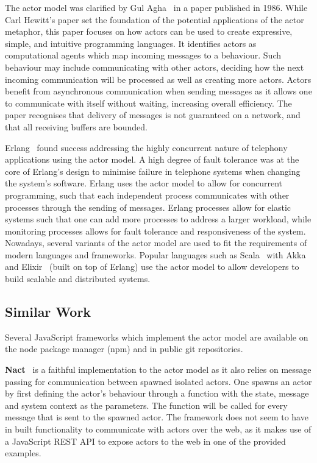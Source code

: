 \documentclass[lettersize,journal]{IEEEtran}
\begin{document}
The actor model was clarified by Gul Agha~\cite{agha1985actors} in a paper published in 1986. While Carl Hewitt's paper set the foundation of the potential applications of the actor metaphor, this paper focuses on how actors can be used to create expressive, simple, and intuitive programming languages. It identifies actors as computational agents which map incoming messages to a behaviour. Such behaviour may include communicating with other actors, deciding how the next incoming communication will be processed as well as creating more actors. Actors benefit from asynchronous communication when sending messages as it allows one to communicate with itself without waiting, increasing overall efficiency. The paper recognises that delivery of messages is not guaranteed on a network, and that all receiving buffers are bounded.

Erlang~\cite{erlang} found success addressing the highly concurrent nature of telephony applications using the actor model. A high degree of fault tolerance was at the core of Erlang's design to minimise failure in telephone systems when changing the system's software. Erlang uses the actor model to allow for concurrent programming, such that each independent process communicates with other processes through the sending of messages. Erlang processes allow for elastic systems such that one can add more processes to address a larger workload, while monitoring processes allows for fault tolerance and responsiveness of the system. Nowadays, several variants of the actor model are used to fit the requirements of modern languages and frameworks. Popular languages such as Scala~\cite{scala} with Akka~\cite{akka} and Elixir~\cite{elixir} (built on top of Erlang) use the actor model to allow developers to build scalable and distributed systems.

\subsection{Similar Work}
Several JavaScript frameworks which implement the actor model are available on the node package manager (npm) and in public git repositories.

\textbf{Nact}~\cite{nact} is a faithful implementation to the actor model as it also relies on message passing for communication between spawned isolated actors. One spawns an actor by first defining the actor's behaviour through a function with the state, message and system context as the parameters. The function will be called for every message that is sent to the spawned actor. The framework does not seem to have in built functionality to communicate with actors over the web, as it makes use of a JavaScript REST API to expose actors to the web in one of the provided examples.
\end{document}
